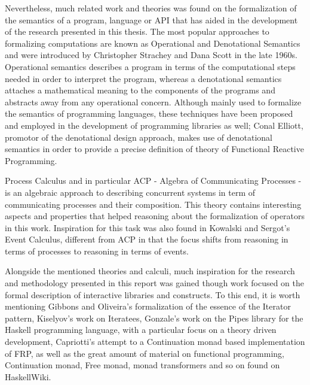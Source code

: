 Nevertheless, much related work and theories was found on the formalization of the semantics of a program, language or API that has aided in the development of the research presented in this thesis. The most popular approaches to formalizing computations are known as Operational and Denotational Semantics and were introduced by Christopher Strachey and Dana Scott in the late 1960s\cite{scott1970outline}. Operational semantics describes a program in terms of the computational steps needed in order to interpret the program, whereas a denotational semantics attaches a mathematical meaning to the components of the programs and abstracts away from any operational concern. Although mainly used to formalize the semantics of programming languages, these techniques have been proposed and employed in the development of programming libraries as well; Conal Elliott, promotor of the denotational design approach\cite{elliottdenotational}, makes use of denotational semantics in order to provide a precise definition of theory of Functional Reactive Programming\cite{elliott1997functional}. 

Process Calculus and in particular ACP\cite{bergstra1984process} - Algebra of Communicating Processes - is an algebraic approach to describing concurrent systems in term of communicating processes and their composition. This theory contains interesting aspects and properties that helped reasoning about the formalization of operators in this work. Inspiration for this task was also found in Kowalski and Sergot's Event Calculus\cite{shanahan1999event}, different from ACP in that the focus shifts from reasoning in terms of processes to reasoning in terms of events.

Alongside the mentioned theories and calculi, much inspiration for the research and methodology presented in this report was gained though work focused on the formal description of interactive libraries and constructs. To this end, it is worth mentioning Gibbons and Oliveira's formalization of the essence of the Iterator pattern\cite{gibbons2009essence}, Kiselyov's work on Iteratees\cite{kiselyov2012iteratees}, Gonzale's work on the Pipes\cite{gonzales2012pipes} library for the Haskell programming language, with a particular focus on a theory driven development, Capriotti's attempt to a Continuation monad based implementation of FRP\cite{capriotti2012contfrp}, as well as the great amount of material on functional programming, Continuation monad, Free monad, monad transformers and so on found on HaskellWiki\cite{haskellwiki}. 

